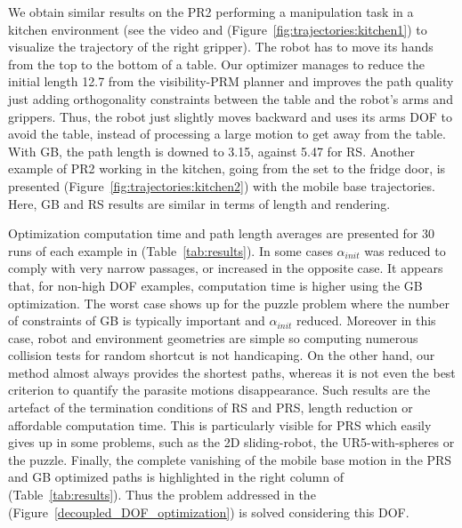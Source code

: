 \documentclass{tADR2e}
\begin{document}
We obtain similar results on the PR2 performing a manipulation task 
in a kitchen environment (see the video and (Figure~\ref{fig:trajectories:kitchen1}) 
to visualize the trajectory of the right gripper). The robot has to move 
its hands from the top to the bottom of a table.
Our optimizer manages to reduce the initial length 12.7 from the visibility-PRM 
planner and improves the path quality 
just adding orthogonality constraints between the table and the 
robot's arms and grippers. Thus, the robot just slightly moves 
backward and uses its arms DOF to avoid the table, instead of 
processing a large motion to get away from the table. With GB, the path length is 
downed to 3.15, against 5.47 for RS.
Another example of PR2 working in the kitchen, going from the set to the fridge 
door, is presented (Figure~\ref{fig:trajectories:kitchen2}) with the mobile base
trajectories. Here, GB and RS results are similar in terms of length and rendering.

\vspace{0.4cm}

Optimization computation time and path length averages are presented for 30 runs of 
each example in (Table~\ref{tab:results}). In some cases $\alpha_{init}$ was 
reduced to comply with very narrow passages, or increased in the opposite case. 
It appears that, for non-high DOF examples, computation time is higher using the GB 
optimization. The worst case shows up for the puzzle problem where the number of 
constraints of GB is typically important and $\alpha_{init}$ reduced. Moreover in this case, robot and environment geometries are simple so computing numerous collision tests for random shortcut is not handicaping.
On the other hand, our method almost always provides the shortest paths, whereas it 
is not even the best criterion to quantify the parasite motions disappearance.
Such results are the artefact of the termination conditions of RS and PRS, length 
reduction or affordable computation time. This is particularly visible for PRS which 
easily gives up in some problems, such as the 2D sliding-robot, the 
UR5-with-spheres or the puzzle.
Finally, the complete vanishing of the mobile base motion in the PRS and GB 
optimized paths is highlighted in the right column of (Table~\ref{tab:results}). 
Thus the problem addressed in the (Figure~\ref{decoupled_DOF_optimization}) is 
solved considering this DOF.
\end{document}
